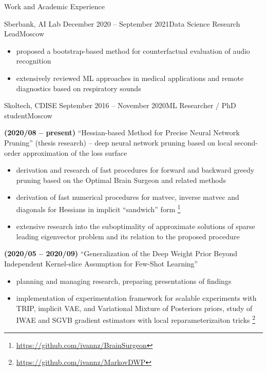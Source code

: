 \documentclass{resume} %
\begin{document}
\begin{rSection}{Work and Academic Experience}
\begin{rSubsection}{
        Sberbank, AI Lab
    }{December 2020 -- September 2021}{Data Science Research Lead}{Moscow}
\begin{itemize}
        \item proposed a bootstrap-based method for counterfactual evaluation of audio recognition

        \item extensively reviewed ML approaches in medical applications and remote diagnostics based on respiratory sounds
    \end{itemize}
\end{rSubsection}

\begin{rSubsection}{
        Skoltech, CDISE
    }{September 2016 -- November 2020}{ML Researcher / PhD student}{Moscow}

    \item \textbf{(2020/08 -- present)}
    ``Hessian-based Method for Precise Neural Network Pruning'' (thesis research) -- deep neural network pruning based on local second-order approximation of the loss surface
    \begin{itemize}
        \item derivation and research of fast procedures for forward and backward greedy pruning based on the Optimal Brain Surgeon and related methods

        \item derivation of fast numerical procedures for matvec, inverse matvec and diagonals for Hessians in implicit ``sandwich'' form%
        \footnote{
            \url{https://github.com/ivannz/BrainSurgeon}
        }

        \item extensive research into the suboptimality of approximate solutions of sparse leading eigenvector problem and its relation to the proposed procedure
    \end{itemize}

    \item \textbf{(2020/05 -- 2020/09)}
    ``Generalization of the Deep Weight Prior Beyond Independent Kernel-slice Assumption for Few-Shot Learning''
    \begin{itemize}
        \item planning and managing research, preparing presentations of findings

        \item implementation of experimentation framework for scalable experiments with TRIP, implicit VAE, and Variational Mixture of Posteriors priors, study of IWAE and SGVB gradient estimators with local reparameterizaiton tricks%
        \footnote{
            \url{https://github.com/ivannz/MarkovDWP}
        }


\end{itemize}
\end{rSubsection}
\end{rSection}
\end{document}
